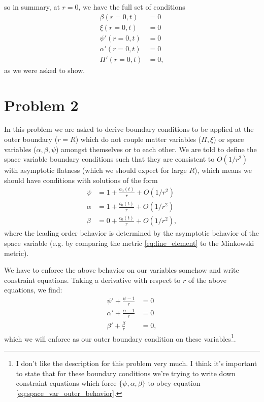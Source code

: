 \documentclass[12pt]{article}
\numberwithin{equation}{section}
\begin{document}
so in summary, at $r = 0$, we have the full set of conditions
\begin{equation}
\begin{aligned}
\beta  (r=0, t) &= 0 \\
\xi    (r=0, t) &= 0 \\
\psi'  (r=0, t) &= 0 \\
\alpha'(r=0, t) &= 0 \\
\Pi'   (r=0, t) &= 0,
\end{aligned}
\end{equation}
as we were asked to show.

\section{Problem 2}
In this problem we are asked to derive boundary conditions to be applied at the outer boundary ($r = R$) which do not couple matter variables ($\Pi, \xi$) or space variables ($\alpha, \beta, \psi$) amongst themselves or to each other.  We are told to define the space variable boundary conditions such that they are consistent to $O(1/r^2)$ with asymptotic flatness (which we should expect for large $R$), which means we should have conditions with solutions of the form
\begin{equation} \label{eq:space_var_outer_behavior}
\begin{aligned}
\psi   &= 1 + \frac{a_0(t)}{r} + O(1/r^2) \\
\alpha &= 1 + \frac{b_0(t)}{r} + O(1/r^2) \\
\beta  &= 0 + \frac{c_0(t)}{r} + O(1/r^2),
\end{aligned}
\end{equation}
where the leading order behavior is determined by the asymptotic behavior of the space variable (e.g. by comparing the metric \ref{eq:line_element} to the Minkowski metric).

We have to enforce the above behavior on our variables somehow and write constraint equations.  Taking a derivative with respect to $r$ of the above equations, we find:
\begin{align}
\psi' + \frac{\psi - 1}{r}     &= 0 \\
\alpha' + \frac{\alpha - 1}{r} &= 0 \\
\beta' + \frac{\beta}{r}       &= 0,
\end{align} 
which we will enforce as our outer boundary condition on these variables\footnote{I don't like the description for this problem very much.  I think it's important to state that for these boundary conditions we're trying to write down constraint equations which force $\{\psi, \alpha, \beta\}$ to obey equation \ref{eq:space_var_outer_behavior}.}.
\end{document}
